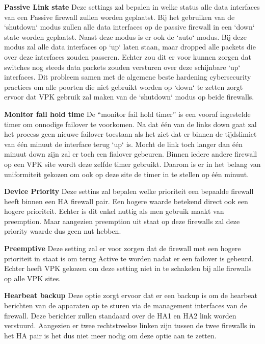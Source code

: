 \textbf{Passive Link state}\newline
Deze settings zal bepalen in welke status alle data interfaces van een Passive firewall zullen worden geplaatst. Bij het gebruiken van de `shutdown` modus zullen alle data interfaces op de passive firewall in een `down` state worden geplaatst. Naast deze modus is er ook de `auto` modus. Bij deze modus zal alle data interfaces op `up` laten staan, maar dropped alle packets die over deze interfaces zouden passeren. Echter zou dit er voor kunnen zorgen dat switches nog steeds data packets zouden versturen over deze schijnbare `up` interfaces. Dit probleem samen met de algemene beste hardening cybersecurity practices om alle poorten die niet gebruikt worden op `down` te zetten zorgt ervoor dat VPK gebruik zal maken van de `shutdown` modus op beide firewalls.\newline


\textbf{Monitor fail hold time}\newline
De ``monitor fail hold timer'' is een vooraf ingestelde timer om onnodige failover te voorkomen. Na dat één van de links down gaat zal het process geen nieuwe failover toestaan als het ziet dat er binnen de tijdslimiet van één minuut de interface terug `up` is. Mocht de link toch langer dan één minuut down zijn zal er toch een fialover gebeuren. Binnen iedere andere firewall op een VPK site wordt deze zelfde timer gebruikt. Daarom is er in het belang van uniformiteit gekozen om ook op deze site de timer in te stellen op één minuut.\newline


\textbf{Device Priority}\newline
Deze settins zal bepalen welke prioriteit een bepaalde firewall heeft binnen een HA firewall pair. Een hogere waarde betekend direct ook een hogere prioriteit. Echter is dit enkel nuttig als men gebruik maakt van preemption. Maar aangezien preemption uit staat op deze firewalls zal deze priority waarde dus geen nut hebben.\newline


\textbf{Preemptive}\newline
Deze setting zal er voor zorgen dat de firewall met een hogere prioriteit in staat is om terug Active te worden nadat er een failover is gebeurd. Echter heeft VPK gekozen om deze setting niet in te schakelen bij alle firewalls op alle VPK sites.\newline


\textbf{Hearbeat backup}\newline
Deze optie zorgt ervoor dat er een backup is om de hearbeat berichten van de apparaten op te sturen via de management interfaces van de firewall. Deze berichter zullen standaard over de HA1 en HA2 link worden verstuurd. Aangezien er twee rechtstreekse linken zijn tussen de twee firewalls in het HA pair is het dus niet meer nodig om deze optie aan te zetten.\newline


